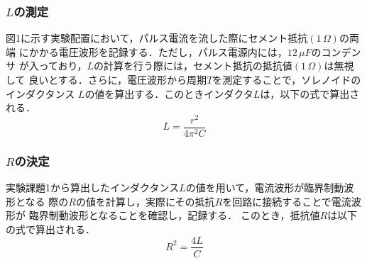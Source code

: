 \subsubsection{$L$の測定}
図1に示す実験配置において，パルス電流を流した際にセメント抵抗$(1\,\Omega)$の両端
にかかる電圧波形を記録する．ただし，パルス電源内には，$12\,\si{\mu F}$のコンデンサ
が入っており，$L$の計算を行う際には，セメント抵抗の抵抗値$(1\,\Omega)$は無視して
良いとする．さらに，電圧波形から周期$T$を測定することで，ソレノイドのインダクタンス
$L$の値を算出する．このときインダクタ$L$は，以下の式で算出される．
$$
L=\frac{r^2}{4\pi^2C}
$$


\subsubsection{$R$の決定}
実験課題1から算出したインダクタンス$L$の値を用いて，電流波形が臨界制動波形となる
際の$R$の値を計算し，実際にその抵抗$R$を回路に接続することで電流波形が
臨界制動波形となることを確認し，記録する．
このとき，抵抗値$R$は以下の式で算出される．
$$
R^2=\frac{4L}{C}
$$